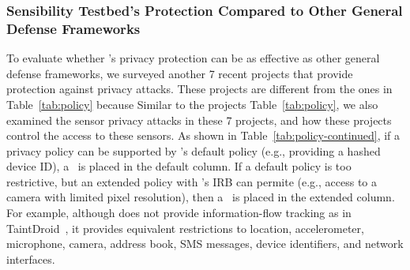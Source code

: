 %



\subsubsection{Sensibility Testbed's Protection Compared to Other General
Defense Frameworks}
To evaluate whether \sysname's privacy protection can be as effective as other 
general defense frameworks, we surveyed another 7 recent projects that provide
protection against privacy attacks. These projects are different from the ones
in Table~\ref{tab:policy} because  Similar to the projects 
Table~\ref{tab:policy}, we also examined the sensor privacy attacks in these 7 
projects, and how these projects control the access to these sensors. 
As shown in Table~\ref{tab:policy-continued}, if a privacy policy can be supported
by \sysname's default policy (e.g., providing a hashed device ID), a \tickmark\ 
is placed in the default column. If a default policy is too restrictive, but an 
extended policy with \sysname's IRB can permite (e.g., access to a camera
with limited pixel resolution), then a \tickmark\ is placed in the extended column.
For example, although \sysname does not provide  information-flow tracking as 
in TaintDroid~\cite{enck2014taintdroid}, it provides equivalent restrictions to 
location, accelerometer, microphone, camera, address book, SMS messages, 
device identifiers, and network interfaces. 

